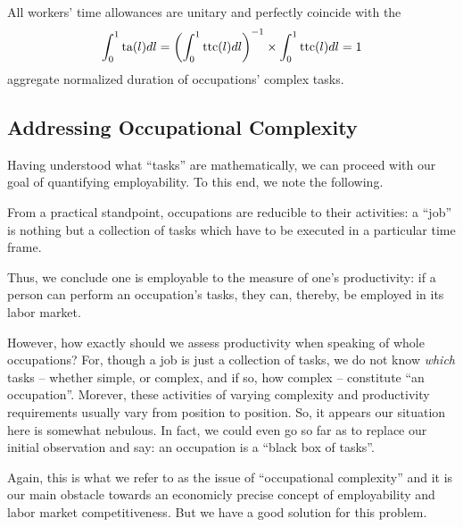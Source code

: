\documentclass[hidelinks, nonatbib]{elsarticle}
\begin{document}
\begin{axiom}
    \label{taa}
    All workers' time allowances are unitary and perfectly coincide with the
    \begin{gather}
        \int_{0}^{1}
        \text{ta}(l)
        dl
        =
        \left(
            \int_{0}^{1}
            \text{ttc}(l)
            dl
        \right) ^ {-1}
        \times
        \int_{0}^{1}{
            \text{ttc}(l)
            dl
        }
        =
        1
    \end{gather}
    aggregate normalized duration of occupations' complex tasks.
\end{axiom}

\subsection{Addressing Occupational Complexity}
Having understood what ``tasks'' are mathematically, we can proceed with our goal of quantifying employability. To this end, we note the following.

\begin{observation}
    \label{oro}
    From a practical standpoint, occupations are reducible to their activities: a ``job'' is nothing but a collection of tasks which have to be executed in a particular time frame.
\end{observation}

Thus, we conclude one is employable to the measure of one's productivity: if a person can perform an occupation's tasks, they can, thereby, be employed in its labor market.

However, how exactly should we assess productivity when speaking of whole occupations? For, though a job is just a collection of tasks, we do not know \textit{which} tasks -- whether simple, or complex, and if so, how complex -- constitute ``an occupation''. Morever, these activities of varying complexity and productivity requirements usually vary from position to position. So, it appears our situation here is somewhat nebulous. In fact, we could even go so far as to replace our initial observation and say: an occupation is a ``black box of tasks''.

Again, this is what we refer to as the issue of ``occupational complexity'' and it is our main obstacle towards an economicly precise concept of employability and labor market competitiveness. But we have a good solution for this problem.
\end{document}
